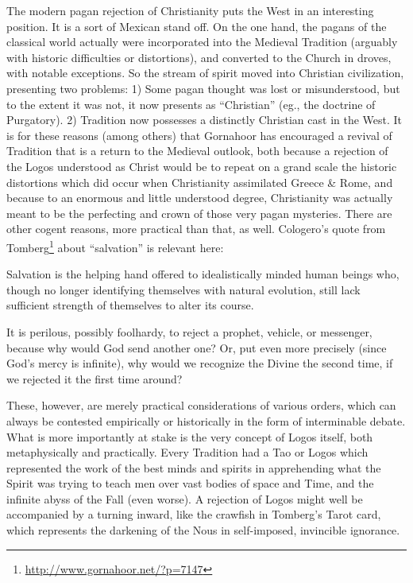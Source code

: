 The modern pagan rejection of Christianity puts the West in an interesting position. It is a sort of Mexican stand off. On the one hand, the pagans of the classical world actually were incorporated into the Medieval Tradition (arguably with historic difficulties or distortions), and converted to the Church in droves, with notable exceptions. So the stream of spirit moved into Christian civilization, presenting two problems: 1) Some pagan thought was lost or misunderstood, but to the extent it was not, it now presents as ``Christian'' (eg., the doctrine of Purgatory). 2) Tradition now possesses a distinctly Christian cast in the West. It is for these reasons (among others) that Gornahoor has encouraged a revival of Tradition that is a return to the Medieval outlook, both because a rejection of the Logos understood as Christ would be to repeat on a grand scale the historic distortions which did occur when Christianity assimilated Greece \& Rome, and because to an enormous and little understood degree, Christianity was actually meant to be the perfecting and crown of those very pagan mysteries. There are other cogent reasons, more practical than that, as well. Cologero's quote from Tomberg\footnote{\url{http://www.gornahoor.net/?p=7147}} about ``salvation'' is relevant here:

\begin{quotex}
Salvation is the helping hand offered to idealistically minded human beings who, though no longer identifying themselves with natural evolution, still lack sufficient strength of themselves to alter its course.
\end{quotex}


It is perilous, possibly foolhardy, to reject a prophet, vehicle, or messenger, because why would God send another one? Or, put even more precisely (since God's mercy is infinite), why would we recognize the Divine the second time, if we rejected it the first time around?

These, however, are merely practical considerations of various orders, which can always be contested empirically or historically in the form of interminable debate. What is more importantly at stake is the very concept of Logos itself, both metaphysically and practically. Every Tradition had a Tao or Logos which represented the work of the best minds and spirits in apprehending what the Spirit was trying to teach men over vast bodies of space and Time, and the infinite abyss of the Fall (even worse). A rejection of Logos might well be accompanied by a turning inward, like the crawfish in Tomberg's Tarot card, which represents the darkening of the Nous in self-imposed, invincible ignorance.

